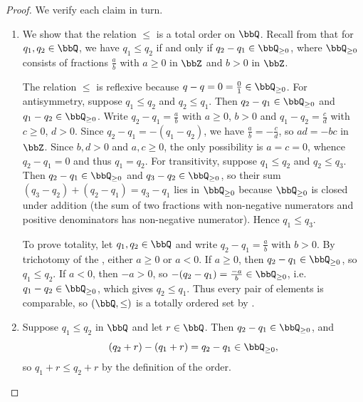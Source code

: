 \begin{proof}
    We verify each claim in turn.

    \begin{enumerate}
        \item We show that the relation $\le$ is a total order on $\bbQ$. Recall from  that for $q_1, q_2 \in \bbQ$, we have $q_1 \le q_2$ if and only if $q_2 - q_1 \in \bbQ_{\ge 0}$, where $\bbQ_{\ge 0}$ consists of fractions $\frac{a}{b}$ with $a \ge 0$ in $\bbZ$ and $b > 0$ in $\bbZ$.

        The relation $\le$ is reflexive because $q - q = 0 = \frac{0}{1} \in \bbQ_{\ge 0}$. For antisymmetry, suppose $q_1 \le q_2$ and $q_2 \le q_1$. Then $q_2 - q_1 \in \bbQ_{\ge 0}$ and $q_1 - q_2 \in \bbQ_{\ge 0}$. Write $q_2 - q_1 = \frac{a}{b}$ with $a \ge 0$, $b > 0$ and $q_1 - q_2 = \frac{c}{d}$ with $c \ge 0$, $d > 0$. Since $q_2 - q_1 = -(q_1 - q_2)$, we have $\frac{a}{b} = -\frac{c}{d}$, so $ad = -bc$ in $\bbZ$. Since $b, d > 0$ and $a, c \ge 0$, the only possibility is $a = c = 0$, whence $q_2 - q_1 = 0$ and thus $q_1 = q_2$. For transitivity, suppose $q_1 \le q_2$ and $q_2 \le q_3$. Then $q_2 - q_1 \in \bbQ_{\ge 0}$ and $q_3 - q_2 \in \bbQ_{\ge 0}$, so their sum $(q_3 - q_2) + (q_2 - q_1) = q_3 - q_1$ lies in $\bbQ_{\ge 0}$ because $\bbQ_{\ge 0}$ is closed under addition (the sum of two fractions with non-negative numerators and positive denominators has non-negative numerator). Hence $q_1 \le q_3$.

        To prove totality, let $q_1, q_2 \in \bbQ$ and write $q_2 - q_1 = \frac{a}{b}$ with $b > 0$. By trichotomy of the , either $a \ge 0$ or $a < 0$. If $a \ge 0$, then $q_2 - q_1 \in \bbQ_{\ge 0}$, so $q_1 \le q_2$. If $a < 0$, then $-a > 0$, so $-(q_2 - q_1) = \frac{-a}{b} \in \bbQ_{\ge 0}$, i.e.\ $q_1 - q_2 \in \bbQ_{\ge 0}$, which gives $q_2 \le q_1$. Thus every pair of elements is comparable, so $(\bbQ, \le)$ is a totally ordered set by .

        \item Suppose $q_1 \le q_2$ in $\bbQ$ and let $r \in \bbQ$. Then $q_2 - q_1 \in \bbQ_{\ge 0}$, and
        $$(q_2 + r) - (q_1 + r) = q_2 - q_1 \in \bbQ_{\ge 0},$$
        so $q_1 + r \le q_2 + r$ by the definition of the order.


\end{enumerate}
\end{proof}
